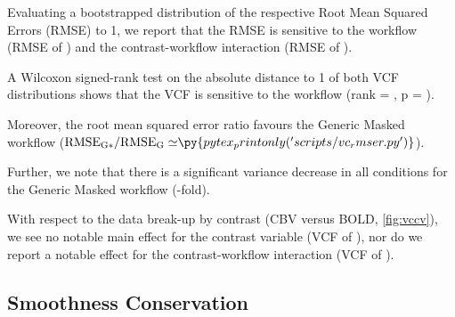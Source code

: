 Evaluating a bootstrapped distribution of the respective Root Mean Squared Errors (RMSE) to 1, we report that the RMSE is sensitive to the
workflow (RMSE of )
and the contrast-workflow interaction (RMSE of ).

A Wilcoxon signed-rank test on the absolute distance to 1 of both VCF distributions shows that the VCF is sensitive to the workflow (rank = , p = ).

%
Moreover, the root mean squared error ratio favours the Generic Masked workflow
($\mathrm{RMSE_{G*}/RMSE_{G}\simeq} \py{pytex_printonly('scripts/vc_rmser.py')}$).

Further, we note that there is a significant variance decrease in all conditions for the Generic Masked workflow
(-fold).

With respect to the data break-up by contrast (CBV versus BOLD, \cref{fig:vccv}), we see no notable main effect for the contrast variable
(VCF of ), nor do we report a notable effect for the contrast-workflow interaction (VCF of ).

\subsection{Smoothness Conservation}

